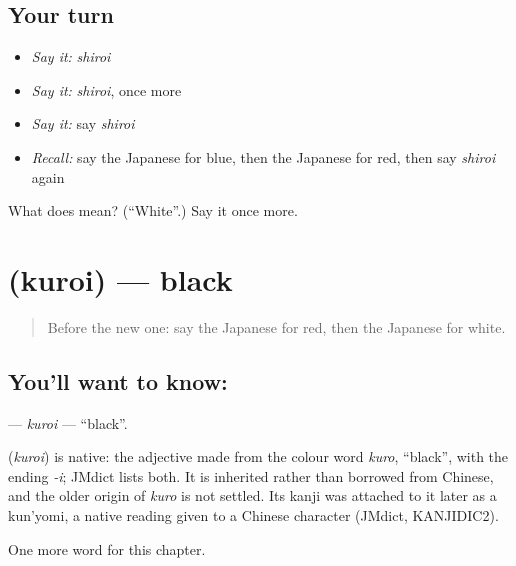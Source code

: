 \subsection*{Your turn}
\begin{itemize}
\raggedright
  \item \emph{Say it:} \emph{shiroi}
  \item \emph{Say it:} \emph{shiroi}, once more
  \item \emph{Say it:} say \emph{shiroi}
  \item \emph{Recall:} say the Japanese for blue, then the Japanese for red, then say \emph{shiroi} again
\end{itemize}

\begin{tcolorbox}[breakable,colback=teal!4,colframe=teal!35!black,title={Before you move on}]
What does  mean? (\textquotedblleft{}White\textquotedblright{}.) Say it once more.
\end{tcolorbox}
\section[\texorpdfstring{\ja{くろい} (kuroi)}{くろい (kuroi)}]{ (kuroi) — black}

\label{lesson:JA-C52-kuroi}



\begin{quote}
Before the new one: say the Japanese for red, then the Japanese for white.
\end{quote}

\subsection*{You'll want to know: }
\textbf{} — \emph{kuroi} — \textquotedblleft{}black\textquotedblright{}.

\begin{cousinweb}
\textbf{} (\emph{kuroi}) is native: the adjective made from the colour word \emph{kuro}, \textquotedblleft{}black\textquotedblright{}, with the ending \emph{-i}; JMdict lists both. It is inherited rather than borrowed from Chinese, and the older origin of \emph{kuro} is not settled. Its kanji was attached to it later as a kun'yomi, a native reading given to a Chinese character (JMdict, KANJIDIC2).
\end{cousinweb}

\begin{grammarlens}[title={What you've built}]
One more word for this chapter.
\end{grammarlens}

